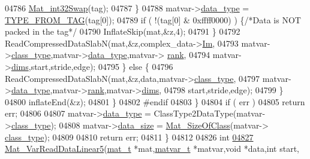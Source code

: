 \begin{DoxyCode}
{{{{{{{{{{{{{{{{{{{{{{{{{{{{04786                     \hyperlink{endian_8c_a2e0153996243f0a34df9a5286087cfa3}{Mat\_int32Swap}(tag);
04787                 \}
04788                 matvar->\hyperlink{group___m_a_t_ab6aafe9bd77f0f077852593dec438144}{data\_type} = \hyperlink{mat5_8c_a82bacecc4afc633b61bc3dc8ef88d1ed}{TYPE\_FROM\_TAG}(tag[0]);
04789                 \textcolor{keywordflow}{if} ( !(tag[0] & 0xffff0000) ) \{\textcolor{comment}{/*Data is NOT packed in the tag*/}
04790                     InflateSkip(mat,&z,4);
04791                 \}
04792                 ReadCompressedDataSlabN(mat,&z,complex\_data->\hyperlink{group___m_a_t_a7182d10b0d3598415887376065440946}{Im},
04793                     matvar->\hyperlink{group___m_a_t_aff13035bf3265dd7d9425e5d40c839d4}{class\_type},matvar->\hyperlink{group___m_a_t_ab6aafe9bd77f0f077852593dec438144}{data\_type},matvar->
      \hyperlink{group___m_a_t_a84ba70c96ded13cc555fa75b768d9921}{rank},
04794                     matvar->\hyperlink{group___m_a_t_a8e01234e1c862ce3472bb37f5a09b92c}{dims},start,stride,edge);
04795             \} \textcolor{keywordflow}{else} \{
04796                 ReadCompressedDataSlabN(mat,&z,data,matvar->\hyperlink{group___m_a_t_aff13035bf3265dd7d9425e5d40c839d4}{class\_type},
04797                     matvar->\hyperlink{group___m_a_t_ab6aafe9bd77f0f077852593dec438144}{data\_type},matvar->\hyperlink{group___m_a_t_a84ba70c96ded13cc555fa75b768d9921}{rank},matvar->\hyperlink{group___m_a_t_a8e01234e1c862ce3472bb37f5a09b92c}{dims},
04798                     start,stride,edge);
04799             \}
04800             inflateEnd(&z);
04801         \}
04802 \textcolor{preprocessor}{#endif}
04803     \}
04804     \textcolor{keywordflow}{if} ( err )
04805         \textcolor{keywordflow}{return} err;
04806 
04807     matvar->\hyperlink{group___m_a_t_ab6aafe9bd77f0f077852593dec438144}{data\_type} = ClassType2DataType(matvar->\hyperlink{group___m_a_t_aff13035bf3265dd7d9425e5d40c839d4}{class\_type});
04808     matvar->\hyperlink{group___m_a_t_a9ad1c82e2b568da617e12dc73a26e1f9}{data\_size} = \hyperlink{group___m_a_t_ga2bf682f015b22fa796a8885e997661e7}{Mat\_SizeOfClass}(matvar->
      \hyperlink{group___m_a_t_aff13035bf3265dd7d9425e5d40c839d4}{class\_type});
04809 
04810     \textcolor{keywordflow}{return} err;
04811 \}
04812 
04826 \textcolor{keywordtype}{int}
\hyperlink{group___m_a_t_ga9c81a102772919ad4841c37e4907e712}{04827} \hyperlink{group___m_a_t_ga9c81a102772919ad4841c37e4907e712}{Mat\_VarReadDataLinear5}(\hyperlink{struct__mat__t}{mat\_t} *mat,\hyperlink{group___m_a_t_structmatvar__t}{matvar\_t} *matvar,\textcolor{keywordtype}{void} *data,\textcolor{keywordtype}{int} start,
}}}}}}}}}}}}}}}}}}}}}}}}}}}}
\end{DoxyCode}
